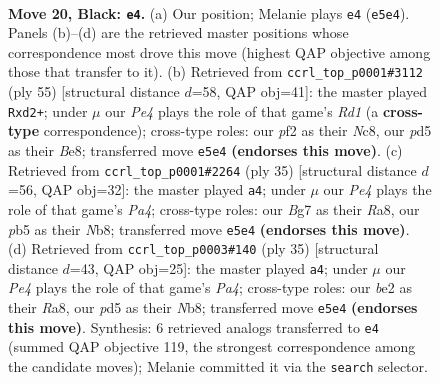 \documentclass[11pt]{article}
\begin{document}
\begin{figure}[p]
\label{fig:thought-m37}
\end{figure}

\clearpage

\begin{figure}[p]\centering
\begin{subfigure}{0.46\textwidth}\centering
\resizebox{\linewidth}{!}{%
\newchessgame
\chessboard[
  setfen={rnr1n1k1/p4pbp/Pp6/1P1Pp2R/8/5N2/4BPP1/R1B1K3 b Q - 0 20},
  showmover=false,
  pgfstyle=straightmove, color=movearrow, markmove={e5-e4}
]}
\caption{}
\end{subfigure}\hfill
\begin{subfigure}{0.46\textwidth}\centering
\resizebox{\linewidth}{!}{%
\newchessgame
\chessboard[
  setfen={2nrb1k1/1p3ppp/2n1p3/2N5/p3PP2/6P1/P2R1K1P/2B2B2 b - - 3 28},
  showmover=false,
  pgfstyle=straightmove, color=movearrow, markmove={d8-d2}
]}
\caption{}
\end{subfigure}
\\[4pt]
\begin{subfigure}{0.46\textwidth}\centering
\resizebox{\linewidth}{!}{%
\newchessgame
\chessboard[
  setfen={rnr1b1k1/1p3ppp/3Rp3/p7/4PP2/1NPB4/1KP3PP/R7 b - - 5 18},
  showmover=false,
  pgfstyle=straightmove, color=movearrow, markmove={a5-a4}
]}
\caption{}
\end{subfigure}\hfill
\begin{subfigure}{0.46\textwidth}\centering
\resizebox{\linewidth}{!}{%
\newchessgame
\chessboard[
  setfen={rnr1b1k1/1p3ppp/3Rp3/p3P3/5P2/1NPB4/1KP3PP/7R b - - 0 18},
  showmover=false,
  pgfstyle=straightmove, color=movearrow, markmove={a5-a4}
]}
\caption{}
\end{subfigure}
\caption{\textbf{Move 20, Black: \texttt{e4}.} (a) Our position; Melanie plays \texttt{e4} (\texttt{e5e4}). Panels (b)--(d) are the retrieved master positions whose correspondence most drove this move (highest QAP objective among those that transfer to it). (b) Retrieved from \texttt{ccrl\_top\_p0001\#3112} (ply 55) [structural distance $d$=58, QAP obj=41]: the master played \texttt{Rxd2+}; under $\mu$ our \emph{Pe4} plays the role of that game's \emph{Rd1} (a \textbf{cross-type} correspondence); cross-type roles: our \emph{p}f2 as their \emph{N}c8, our \emph{p}d5 as their \emph{B}e8; transferred move \texttt{e5e4} \textbf{(endorses this move)}. (c) Retrieved from \texttt{ccrl\_top\_p0001\#2264} (ply 35) [structural distance $d$=56, QAP obj=32]: the master played \texttt{a4}; under $\mu$ our \emph{Pe4} plays the role of that game's \emph{Pa4}; cross-type roles: our \emph{B}g7 as their \emph{R}a8, our \emph{p}b5 as their \emph{N}b8; transferred move \texttt{e5e4} \textbf{(endorses this move)}. (d) Retrieved from \texttt{ccrl\_top\_p0003\#140} (ply 35) [structural distance $d$=43, QAP obj=25]: the master played \texttt{a4}; under $\mu$ our \emph{Pe4} plays the role of that game's \emph{Pa4}; cross-type roles: our \emph{b}e2 as their \emph{R}a8, our \emph{p}d5 as their \emph{N}b8; transferred move \texttt{e5e4} \textbf{(endorses this move)}. Synthesis: 6 retrieved analogs transferred to \texttt{e4} (summed QAP objective 119, the strongest correspondence among the candidate moves); Melanie committed it via the \texttt{search} selector.}

\end{figure}
\end{document}
